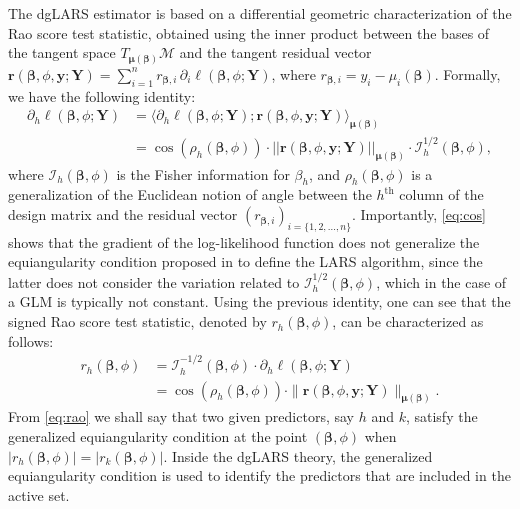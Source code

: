 The dgLARS estimator is based on a differential geometric characterization of the Rao score test statistic, obtained using the inner product between the bases of the tangent space $T_{\boldsymbol{\mu}(\boldsymbol{\beta})}\mathcal{M}$ and the tangent residual vector $\bm{r}(\boldsymbol{\beta}, \phi, \bm{y}; \bm{Y}) = \sum_{i=1}^{n} r_{\boldsymbol{\beta},i} \, \partial_i \ell(\boldsymbol{\beta},\phi; \bm{Y})$, where $r_{\boldsymbol{\beta},i}=y_i-\mu_i(\boldsymbol{\beta})$. Formally, we have the following identity:
%
\begin{align}
\partial_h \ell(\boldsymbol{\beta}, \phi; \bm{Y}) &= \langle \partial_h \ell(\boldsymbol{\beta}, \phi; \bm{Y}) ; \bm{r}(\boldsymbol{\beta}, \phi, \bm{y}; \bm{Y}) \rangle_{\boldsymbol{\mu}(\boldsymbol{\beta})}  \nonumber \\
&= \cos (\rho_h(\boldsymbol{\beta}, \phi)) \cdot ||\bm{r}(\boldsymbol{\beta}, \phi, \bm{y}; \bm{Y}) ||_{\boldsymbol{\mu}(\boldsymbol{\beta})} \cdot \mathcal{I}_{h}^{1/2}(\boldsymbol{\beta}, \phi), 
\label{eq:cos}
\end{align}
where $\mathcal{I}_{h}(\boldsymbol{\beta}, \phi)$ is the Fisher information for $\beta_h$, and $\rho_h(\boldsymbol{\beta}, \phi)$ is a generalization of the Euclidean notion of angle between the $h^{\text{th}}$ column of the design matrix and the residual vector $(r_{\boldsymbol{\beta},i})_{i=\{1, 2,\ldots, n\}}$. Importantly, \eqref{eq:cos}  shows that the gradient of the log-likelihood function does not generalize the equiangularity condition proposed in \cite{efron04} to define the LARS algorithm, since the latter does not consider the variation related to $\mathcal{I}_{h}^{1/2}(\boldsymbol{\beta}, \phi)$, which in the case of a GLM is typically not constant. Using the previous identity, one can see that the signed Rao score test statistic, denoted by $r_{h}(\boldsymbol{\beta}, \phi)$, can be characterized as follows:
%
\begin{align}
r_{h}(\boldsymbol{\beta}, \phi) &= \mathcal{I}^{-1/2}_{h}(\boldsymbol{\beta}, \phi) \cdot \partial_h \ell(\boldsymbol{\beta}, \phi; \bm{Y})   \nonumber \\
&=  \cos(\rho_h(\boldsymbol\beta, \phi)) \cdot \|\bm{r}(\boldsymbol{\beta}, \phi, \bm{y}; \bm{Y}) \|_{\boldsymbol{\mu}(\boldsymbol{\beta})}.
\label{eq:rao}
\end{align}
%
From \eqref{eq:rao} we shall say that two given predictors, say $h$ and $k$, satisfy the generalized equiangularity condition at the point $(\boldsymbol{\beta}, \phi)$ when $|r_{h}(\boldsymbol{\beta}, \phi)|=|r_{k}(\boldsymbol{\beta}, \phi)|$. Inside the dgLARS theory, the generalized equiangularity condition is used to identify the predictors that are included in the active set.

